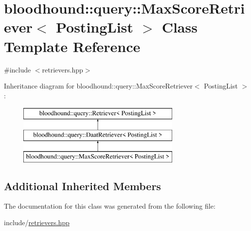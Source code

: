 \hypertarget{classbloodhound_1_1query_1_1MaxScoreRetriever}{}\section{bloodhound\+:\+:query\+:\+:Max\+Score\+Retriever$<$ Posting\+List $>$ Class Template Reference}
\label{classbloodhound_1_1query_1_1MaxScoreRetriever}


{\ttfamily \#include $<$retrievers.\+hpp$>$}

Inheritance diagram for bloodhound\+:\+:query\+:\+:Max\+Score\+Retriever$<$ Posting\+List $>$\+:\begin{figure}[H]
\begin{center}
\leavevmode
\includegraphics[height=3.000000cm]{classbloodhound_1_1query_1_1MaxScoreRetriever}
\end{center}
\end{figure}
\subsection*{Additional Inherited Members}


The documentation for this class was generated from the following file\+:\begin{DoxyCompactItemize}
\item 
include/\mbox{\hyperlink{retrievers_8hpp}{retrievers.\+hpp}}\end{DoxyCompactItemize}
